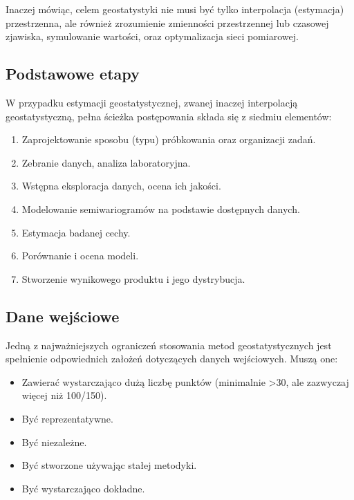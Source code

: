 \documentclass[
  paper=6in:9in,pagesize=pdftex,headinclude=on,footinclude=on,10pt]{scrbook}
\providecommand{\tightlist}{%
  \setlength{\itemsep}{0pt}\setlength{\parskip}{0pt}}
\begin{document}
Inaczej mówiąc, celem geostatystyki nie musi być tylko interpolacja (estymacja) przestrzenna, ale również zrozumienie zmienności przestrzennej lub czasowej zjawiska, symulowanie wartości, oraz optymalizacja sieci pomiarowej.

\subsection{Podstawowe etapy}\label{podstawowe-etapy}

W przypadku estymacji geostatystycznej, zwanej inaczej interpolacją geostatystyczną, pełna ścieżka postępowania składa się z siedmiu elementów:

\begin{enumerate}
\def\labelenumi{\arabic{enumi}.}
\tightlist
\item
  Zaprojektowanie sposobu (typu) próbkowania oraz organizacji zadań.
\item
  Zebranie danych, analiza laboratoryjna.
\item
  Wstępna eksploracja danych, ocena ich jakości.
\item
  Modelowanie semiwariogramów na podstawie dostępnych danych.
\item
  Estymacja badanej cechy.
\item
  Porównanie i ocena modeli.
\item
  Stworzenie wynikowego produktu i jego dystrybucja.
\end{enumerate}

\subsection{Dane wejściowe}\label{dane-wejux15bciowe}

Jedną z najważniejszych ograniczeń stosowania metod geostatystycznych jest spełnienie odpowiednich założeń dotyczących danych wejściowych.
Muszą one:

\begin{itemize}
\tightlist
\item
  Zawierać wystarczająco dużą liczbę punktów (minimalnie \textgreater30, ale zazwyczaj więcej niż 100/150).
\item
  Być reprezentatywne.
\item
  Być niezależne.
\item
  Być stworzone używając stałej metodyki.
\item
  Być wystarczająco dokładne.
\end{itemize}
\end{document}
